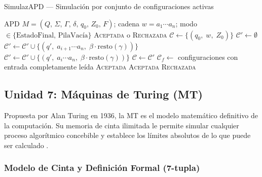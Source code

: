 \begin{algobox}{SimulazAPD — Simulación por conjunto de configuraciones activas}
\begin{algorithmic}[1]
  \Require APD $M = (Q,\,\Sigma,\,\Gamma,\,\delta,\,q_0,\,Z_0,\,F)$;\;
           cadena $w = a_1\cdots a_n$;\;
           modo $\in \{\text{EstadoFinal},\,\text{PilaVacía}\}$
  \Ensure  \textsc{Aceptada} o \textsc{Rechazada}
  \State {}
  \State $\mathcal{C} \gets \{(q_0,\; w,\; Z_0)\}$
    \State $\mathcal{C}' \gets \emptyset$
      \State {}
        \State $\mathcal{C}' \gets \mathcal{C}' \cup \{(q',\; a_{i+1}{\cdots}a_n,\; \beta\cdot\text{resto}(\gamma))\}$
      \EndFor
      \State {}
        \State $\mathcal{C}' \gets \mathcal{C}' \cup \{(q',\; a_i{\cdots}a_n,\; \beta\cdot\text{resto}(\gamma))\}$
      \EndFor
    \EndFor
    \State $\mathcal{C} \gets \mathcal{C}'$
  \EndWhile
  \State
  \State $\mathcal{C}_f \gets$ configuraciones con entrada completamente leída
    \State \Return \textsc{Aceptada}
    \State \Return \textsc{Aceptada}
  \Else
    \State \Return \textsc{Rechazada}
  \EndIf
\end{algorithmic}
\end{algobox}

\subsection*{Unidad 7: Máquinas de Turing (MT)}

Propuesta por Alan Turing en 1936, la MT es el modelo matemático definitivo de la computación.
Su memoria de cinta ilimitada le permite simular cualquier proceso algorítmico concebible y
establece los límites absolutos de lo que puede ser calculado \cite{sipser2012}.

\subsubsection*{Modelo de Cinta y Definición Formal (7-tupla)}

